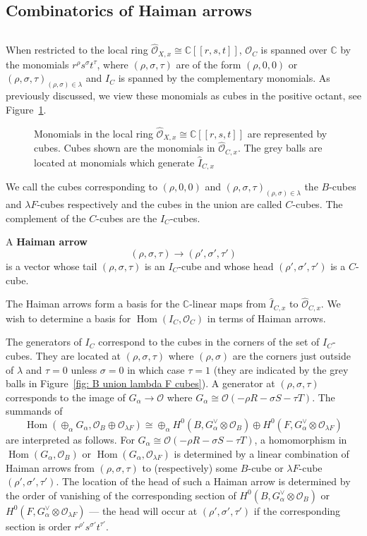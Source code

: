 \documentclass[12pt]{amsart}
\theoremstyle{definition}
\newcommand{\CC} {\mathbb{C}}          %
\renewcommand{\O}{\mathcal{O}}
\newcommand{\Hom}{\operatorname{Hom}}
\renewcommand{\hat}{\widehat}
\newcommand{\SubSecSpace}{$\,$\vspace{0.2cm}\par } %
\begin{document}
\subsection{Combinatorics of Haiman arrows}\label{subsec: combinatorics of Haiman arrows}
\SubSecSpace 
When restricted to the local ring $\widehat{\O}_{X,x} \cong \CC [[r,s,t]]$,
$\O_{C}$ is spanned over $\CC$ by the monomials
$r^{\rho}s^{\sigma}t^{\tau}$, where $(\rho ,\sigma ,\tau )$ are of the
form $(\rho ,0,0)$ or $(\rho ,\sigma ,\tau )_{(\rho ,\sigma )\in
\lambda}$ and $I_{C}$ is spanned by the complementary monomials. As
previously discussed, we view these monomials as cubes in the positive
octant, see Figure~\ref{fig: B union lambda F cubes}.


\begin{figure}

\caption{Monomials in the local ring
$\widehat{\O}_{X,x} \cong \CC [[r,s,t]]$ are represented by
cubes. Cubes shown are the monomials in
$\widehat{\O}_{C,x}$. The grey balls are located at monomials which
generate $\hat{I}_{C,x}$ }\label{fig: B union lambda F cubes}
\end{figure}

We call the cubes corresponding to $(\rho ,0,0)$ and $(\rho ,\sigma
,\tau )_{(\rho ,\sigma )\in \lambda}$ the $B$-cubes and $\lambda
F$-cubes respectively and the cubes in the union are called
$C$-cubes. The complement of the $C$-cubes are the $I_{C}$-cubes.

A \textbf{Haiman arrow} 
\[
(\rho ,\sigma ,\tau )\to (\rho ',\sigma ',\tau ')
\]
is a vector whose tail $(\rho ,\sigma ,\tau )$ is an $I_{C}$-cube and
whose head $(\rho ',\sigma ',\tau ')$ is a $C$-cube.

The Haiman arrows form a basis for the $\CC$-linear maps from
$\widehat{I}_{C,x}$ to $\hat{\O}_{C,x}$. We wish to determine a basis
for $\Hom (I_{C},\O_{C})$ in terms of Haiman arrows.

The generators of $I_{C}$ correspond to the cubes in the corners of
the set of $I_{C}$-cubes. They are located at $(\rho ,\sigma ,\tau )$
where $(\rho ,\sigma )$ are the corners just outside of $\lambda$ and
$\tau =0$ unless $\sigma =0$ in which case $\tau =1$ (they are
indicated by the grey balls in Figure~\ref{fig: B union lambda F
cubes}). A generator at $(\rho ,\sigma ,\tau )$ corresponds to the
image of $G_{\alpha}\to \O$ where $G_{\alpha}\cong \O (-\rho R-\sigma
S-\tau T)$. The summands of
\[
\Hom (\oplus_{\alpha}G_{\alpha},\O_{B}\oplus \O_{\lambda F}) \cong
\oplus_{\alpha} H^{0}(B,G_{\alpha}^{\vee}\otimes \O_{B})\oplus
H^{0}(F,G_{\alpha}^{\vee}\otimes \O_{\lambda F})
\]
are interpreted as follows. For $G_{\alpha}\cong \O (-\rho R-\sigma
S-\tau T)$, a homomorphism in $\Hom (G_{\alpha},\O_{B})$ or $\Hom
(G_{\alpha},\O_{\lambda F})$ is determined by a linear combination of
Haiman arrows from $(\rho ,\sigma ,\tau )$ to (respectively) some
$B$-cube or $\lambda F$-cube $(\rho ',\sigma ',\tau ').$ The location
of the head of such a Haiman arrow is determined by the order of
vanishing of the corresponding section of
$H^{0}(B,G_{\alpha}^{\vee}\otimes \O_{B})$ or
$H^{0}(F,G_{\alpha}^{\vee}\otimes \O_{\lambda F})$ --- the head will
occur at $(\rho ',\sigma ',\tau ')$ if the corresponding section is
order $r^{\rho '}s^{\sigma '}t^{\tau '}$.
\end{document}
